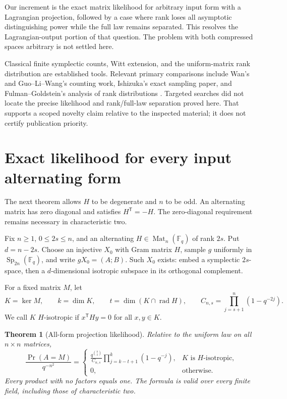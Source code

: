 \documentclass[11pt]{article}
\newcommand{\F}{\mathbb F_q}
\newcommand{\Sp}{\operatorname{Sp}}
\newcommand{\rad}{\operatorname{rad}}
\newcommand{\Mat}{\operatorname{Mat}}
\newcommand{\1}{\mathbf 1}
\newtheorem{theorem}{Theorem}[section]
\theoremstyle{definition}
\theoremstyle{remark}
\numberwithin{equation}{section}
\begin{document}
Our increment is the exact matrix likelihood for arbitrary input form with a Lagrangian projection, followed by a case where rank loses all asymptotic distinguishing power while the full law remains separated. This resolves the Lagrangian-output portion of that question. The problem with both compressed spaces arbitrary is not settled here.

Classical finite symplectic counts, Witt extension, and the uniform-matrix rank distribution are established tools. Relevant primary comparisons include Wan's and Guo--Li--Wang's counting work, Ishizuka's exact sampling paper, and Fulman--Goldstein's analysis of rank distributions \cite{wan,guo,ishizuka,fulman}. Targeted searches did not locate the precise likelihood and rank/full-law separation proved here. That supports a scoped novelty claim relative to the inspected material; it does not certify publication priority.

\section{Exact likelihood for every input alternating form}
The next theorem allows $H$ to be degenerate and $n$ to be odd. An alternating matrix has zero diagonal and satisfies $H^{\mathsf T}=-H$. The zero-diagonal requirement remains necessary in characteristic two.

Fix $n\ge1$, $0\le2s\le n$, and an alternating $H\in\Mat_n(\F)$ of rank $2s$. Put $d=n-2s$. Choose an injective $X_0$ with Gram matrix $H$, sample $g$ uniformly in $\Sp_{2n}(\F)$, and write $gX_0=(A;B)$. Such $X_0$ exists: embed a symplectic $2s$-space, then a $d$-dimensional isotropic subspace in its orthogonal complement.

For a fixed matrix $M$, let
\[
K=\ker M,\qquad k=\dim K,\qquad t=\dim(K\cap\rad H),\qquad
C_{n,s}=\prod_{j=s+1}^n(1-q^{-2j}).
\]
We call $K$ $H$-isotropic if $x^{\mathsf T}Hy=0$ for all $x,y\in K$.

\begin{theorem}[All-form projection likelihood]\label{thm:likelihood}
Relative to the uniform law on all $n\times n$ matrices,
\begin{equation}\label{eq:general-density}
\frac{\Pr(A=M)}{q^{-n^2}}=
\begin{cases}
\displaystyle\frac{q^{\binom{k}{2}}}{C_{n,s}}
\prod_{j=k-t+1}^{k}(1-q^{-j}),&K\text{ is }H\text{-isotropic},\\[6pt]
0,&\text{otherwise}.
\end{cases}
\end{equation}
Every product with no factors equals one. The formula is valid over every finite field, including those of characteristic two.
\end{theorem}
\end{document}
